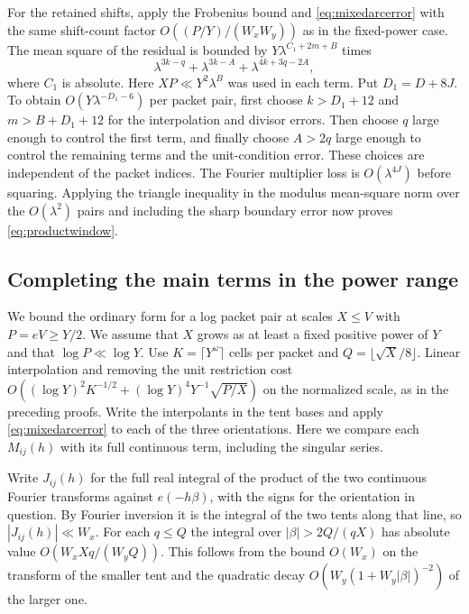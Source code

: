 \documentclass[11pt,a4paper]{article}
\numberwithin{equation}{section}
\begin{document}
For the retained shifts, apply the Frobenius bound and
\cref{eq:mixedarcerror} with the same shift-count factor
$O((P/Y)/(W_xW_y))$ as in the fixed-power case. The mean
square of the residual is bounded by $Y\lambda^{C_1+2m+B}$
times
\[
  \lambda^{3k-q}+\lambda^{3k-A}+\lambda^{4k+3q-2A},
\]
where $C_1$ is absolute. Here $XP\ll Y^2\lambda^B$ was
used in each term. Put $D_1=D+8J$. To obtain
$O(Y\lambda^{-D_1-6})$ per
packet pair, first choose $k>D_1+12$ and $m>B+D_1+12$
for the interpolation and divisor errors. Then choose $q$
large enough to control the first term,
and finally choose $A>2q$ large enough to control the
remaining terms and the unit-condition error. These choices
are independent of the packet indices. The Fourier multiplier
loss is $O(\lambda^{4J})$ before squaring. Applying the
triangle inequality in the modulus mean-square norm over the
$O(\lambda^2)$ pairs and including the sharp boundary error
now proves \cref{eq:productwindow}.

\subsection{Completing the main terms in the power range}

We bound the ordinary form for a log packet pair at scales
$X\le V$ with $P=eV\ge Y/2$. We assume that $X$ grows as
at least a fixed positive power of $Y$ and that $\log P\ll\log Y$.
Use $K=\lceil Y^\omega\rceil$ cells per packet and
$Q=\lfloor\sqrt X/8\rfloor$. Linear interpolation and
removing the unit restriction cost
$O((\log Y)^2K^{-1/2}+(\log Y)^4Y^{-1}\sqrt{P/X})$ on
the normalized scale, as in the preceding proofs.
Write the interpolants in the tent bases and apply
\cref{eq:mixedarcerror} to each of the three orientations.
Here we compare each $M_{ij}(h)$ with its full continuous
term, including the singular series.

Write $J_{ij}(h)$ for the full real integral of the
product of the two continuous Fourier transforms against
$e(-h\beta)$, with the signs for the orientation in question.
By Fourier inversion it is the integral of the two tents
along that line, so $|J_{ij}(h)|\ll W_x$. For each $q\le Q$
the integral over $|\beta|>2Q/(qX)$ has absolute value
$O(W_x Xq/(W_y Q))$. This follows from the bound $O(W_x)$
on the transform of the smaller tent and the quadratic
decay $O(W_y(1+W_y|\beta|)^{-2})$ of the larger one.
\end{document}
